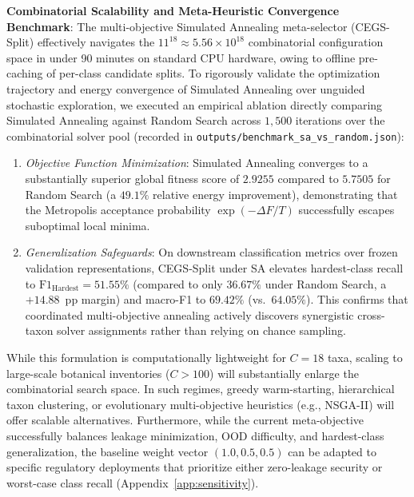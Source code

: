 \documentclass[a4paper,fleqn]{cas-sc}
\begin{document}
\textbf{Combinatorial Scalability and Meta-Heuristic Convergence Benchmark}: The multi-objective Simulated Annealing meta-selector (CEGS-Split) effectively navigates the $11^{18} \approx 5.56 \times 10^{18}$ combinatorial configuration space in under 90 minutes on standard CPU hardware, owing to offline pre-caching of per-class candidate splits. To rigorously validate the optimization trajectory and energy convergence of Simulated Annealing over unguided stochastic exploration, we executed an empirical ablation directly comparing Simulated Annealing against Random Search across $1{,}500$ iterations over the combinatorial solver pool (recorded in \texttt{outputs/benchmark\_sa\_vs\_random.json}):
\begin{enumerate}
\item \emph{Objective Function Minimization}: Simulated Annealing converges to a substantially superior global fitness score of $2.9255$ compared to $5.7505$ for Random Search (a $49.1\%$ relative energy improvement), demonstrating that the Metropolis acceptance probability $\exp(-\Delta F / T)$ successfully escapes suboptimal local minima.
\item \emph{Generalization Safeguards}: On downstream classification metrics over frozen validation representations, CEGS-Split under SA elevates hardest-class recall to $\mathrm{F1}_{\text{Hardest}} = 51.55\%$ (compared to only $36.67\%$ under Random Search, a $+14.88$~pp margin) and macro-F1 to $69.42\%$ (vs.\ $64.05\%$). This confirms that coordinated multi-objective annealing actively discovers synergistic cross-taxon solver assignments rather than relying on chance sampling.
\end{enumerate}
While this formulation is computationally lightweight for $C=18$ taxa, scaling to large-scale botanical inventories ($C > 100$) will substantially enlarge the combinatorial search space. In such regimes, greedy warm-starting, hierarchical taxon clustering, or evolutionary multi-objective heuristics (e.g., NSGA-II) will offer scalable alternatives. Furthermore, while the current meta-objective successfully balances leakage minimization, OOD difficulty, and hardest-class generalization, the baseline weight vector $(1.0, 0.5, 0.5)$ can be adapted to specific regulatory deployments that prioritize either zero-leakage security or worst-case class recall (Appendix~\ref{app:sensitivity}).
\end{document}
